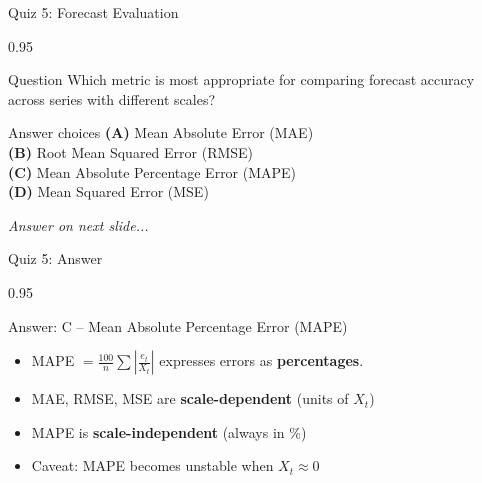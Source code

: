 \documentclass[9pt, aspectratio=169, t]{beamer}
\begin{document}
\begin{frame}{Quiz 5: Forecast Evaluation}
    \begin{cminipage}{0.95\textwidth}
    \begin{alertblock}{Question}
        Which metric is most appropriate for comparing forecast accuracy across series with different scales?
    \end{alertblock}

    \vspace{0.4cm}

    \begin{block}{Answer choices}
        \textcolor{MainBlue}{\textbf{(A)}} Mean Absolute Error (MAE)\\[3pt]
        \textcolor{MainBlue}{\textbf{(B)}} Root Mean Squared Error (RMSE)\\[3pt]
        \textcolor{MainBlue}{\textbf{(C)}} Mean Absolute Percentage Error (MAPE)\\[3pt]
        \textcolor{MainBlue}{\textbf{(D)}} Mean Squared Error (MSE)
    \end{block}

    \vspace{0.5cm}

    \begin{center}
        \textit{Answer on next slide...}
    \end{center}
    \end{cminipage}
\end{frame}

\begin{frame}{Quiz 5: Answer}
    \begin{cminipage}{0.95\textwidth}
    \begin{exampleblock}{Answer: C -- Mean Absolute Percentage Error (MAPE)}
        \begin{itemize}
            \item MAPE $= \frac{100}{n}\sum\left|\frac{e_t}{X_t}\right|$ expresses errors as \textbf{percentages}.
            \item MAE, RMSE, MSE are \textbf{scale-dependent} (units of $X_t$)
            \item MAPE is \textbf{scale-independent} (always in \%)
            \item Caveat: MAPE becomes unstable when $X_t \approx 0$
        \end{itemize}
    \end{exampleblock}

    \end{cminipage}
\end{frame}
\end{document}

